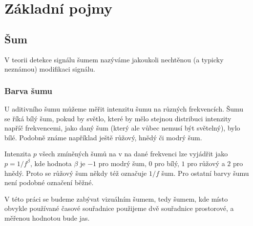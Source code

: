 \chapter{Základní pojmy}

\section{Šum}

V teorii detekce signálu šumem nazýváme jakoukoli nechtěnou (a typicky neznámou) modifikaci signálu.

\subsection{Barva šumu}

U aditivního šumu můžeme měřit intenzitu šumu na různých frekvencích. Šumu se
říká bílý šum, pokud by světlo, které by mělo stejnou distribuci intenzity
napříč frekvencemi, jako daný šum (který ale vůbec nemusí být světelný), bylo
bílé. Podobně známe například ještě růžový, hnědý či modrý šum.

Intenzita $p$ všech zmíněných šumů na v na dané frekvenci lze vyjádřit jako $p=1/f^\beta$, kde hodnota $\beta$ je $-1$ pro modrý šum, $0$ pro bílý, $1$ pro růžový a $2$ pro hnědý. Proto se růžový šum někdy též označuje $1/f$ šum. Pro ostatní barvy šumu není podobné označení běžné. 

V této práci se budeme zabývat vizuálním šumem, tedy šumem, kde místo obvykle
používané časové souřadnice použijeme dvě souřadnice prostorové, a měřenou
hodnotou bude jas. 

